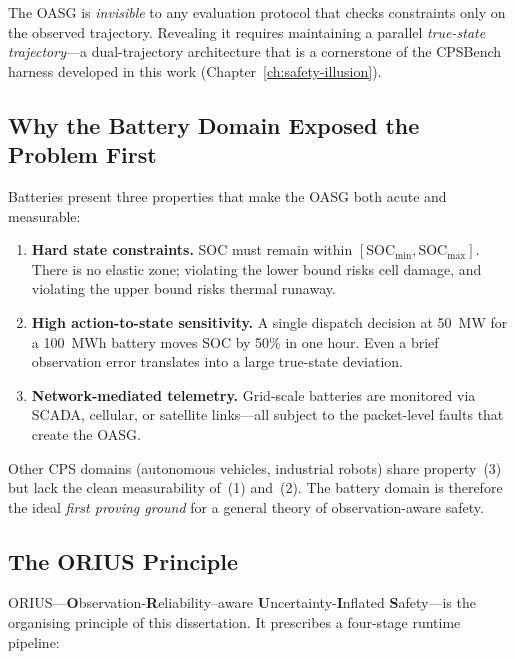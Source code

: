 The OASG is \emph{invisible} to any evaluation protocol that checks
constraints only on the observed trajectory.  Revealing it requires
maintaining a parallel \emph{true-state trajectory}---a dual-trajectory
architecture that is a cornerstone of the CPSBench harness developed in
this work (Chapter~\ref{ch:safety-illusion}).

\subsection{Why the Battery Domain Exposed the Problem First}

Batteries present three properties that make the OASG both acute and
measurable:

\begin{enumerate}
  \item \textbf{Hard state constraints.}  SOC must remain within
    $[\text{SOC}_{\min}, \text{SOC}_{\max}]$.  There is no elastic zone;
    violating the lower bound risks cell damage, and violating the upper
    bound risks thermal runaway.
  \item \textbf{High action-to-state sensitivity.}  A single dispatch
    decision at 50~MW for a 100~MWh battery moves SOC by 50\% in one hour.
    Even a brief observation error translates into a large true-state
    deviation.
  \item \textbf{Network-mediated telemetry.}  Grid-scale batteries are
    monitored via SCADA, cellular, or satellite links---all subject to the
    packet-level faults that create the OASG.
\end{enumerate}

Other CPS domains (autonomous vehicles, industrial robots) share
property~(3) but lack the clean measurability of~(1) and~(2).  The battery
domain is therefore the ideal \emph{first proving ground} for a general
theory of observation-aware safety.

\subsection{The ORIUS Principle}
\label{sec:orius-principle}

ORIUS---\textbf{O}bservation-\textbf{R}eliability--aware
\textbf{U}ncertainty-\textbf{I}nflated \textbf{S}afety---is the
organising principle of this dissertation.  It prescribes a four-stage
runtime pipeline:

